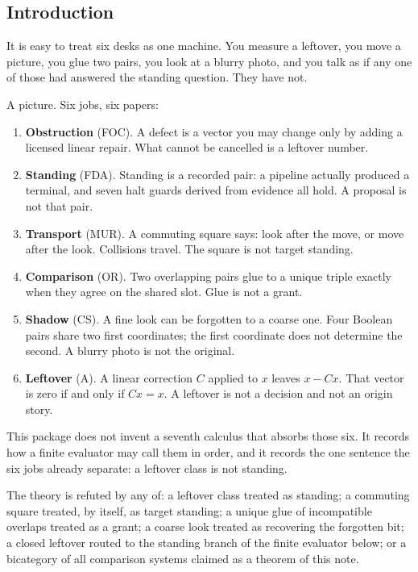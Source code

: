 \documentclass[
  11pt,
]{article}
\providecommand{\tightlist}{%
  \setlength{\itemsep}{0pt}\setlength{\parskip}{0pt}}
\begin{document}
\subsection{Introduction}\label{introduction}

It is easy to treat six desks as one machine. You measure a leftover, you move a picture, you glue two pairs, you look at a blurry photo, and you talk as if any one of those had answered the standing question. They have not.

A picture. Six jobs, six papers:

\begin{enumerate}
\def\labelenumi{\arabic{enumi}.}
\tightlist
\item
  \textbf{Obstruction} (FOC). A defect is a vector you may change only by adding a licensed linear repair. What cannot be cancelled is a leftover number.
\item
  \textbf{Standing} (FDA). Standing is a recorded pair: a pipeline actually produced a terminal, and seven halt guards derived from evidence all hold. A proposal is not that pair.
\item
  \textbf{Transport} (MUR). A commuting square says: look after the move, or move after the look. Collisions travel. The square is not target standing.
\item
  \textbf{Comparison} (OR). Two overlapping pairs glue to a unique triple exactly when they agree on the shared slot. Glue is not a grant.
\item
  \textbf{Shadow} (CS). A fine look can be forgotten to a coarse one. Four Boolean pairs share two first coordinates; the first coordinate does not determine the second. A blurry photo is not the original.
\item
  \textbf{Leftover} (A). A linear correction \(C\) applied to \(x\) leaves \(x-Cx\). That vector is zero if and only if \(Cx=x\). A leftover is not a decision and not an origin story.
\end{enumerate}

This package does not invent a seventh calculus that absorbs those six. It records how a finite evaluator may call them in order, and it records the one sentence the six jobs already separate: a leftover class is not standing.

The theory is refuted by any of: a leftover class treated as standing; a commuting square treated, by itself, as target standing; a unique glue of incompatible overlaps treated as a grant; a coarse look treated as recovering the forgotten bit; a closed leftover routed to the standing branch of the finite evaluator below; or a bicategory of all comparison systems claimed as a theorem of this note.
\end{document}
